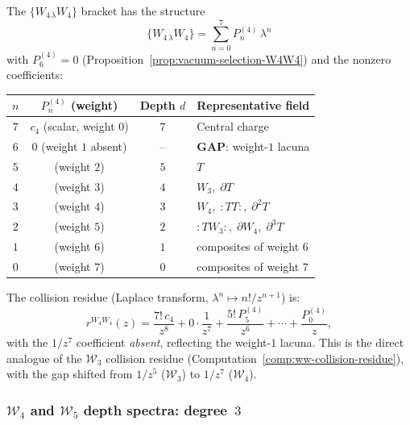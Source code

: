 \begin{computation}
\label{comp:w4w4-collision-residue}
%
The $\{W_{4\,\lambda} W_4\}$ bracket has the structure
\begin{equation}
\label{eq:w4w4-lambda-bracket}
\{W_{4\,\lambda} W_4\}
= \sum_{n=0}^{7} P_n^{(4)}\,\lambda^n
\end{equation}
with $P_6^{(4)} = 0$ (Proposition~\ref{prop:vacuum-selection-W4W4})
and the nonzero coefficients:
\begin{center}
\small
\renewcommand{\arraystretch}{1.3}
\begin{tabular}{cccl}
\toprule
$n$ & $P_n^{(4)}$ (weight) & Depth $d$ & Representative field \\
\midrule
$7$ & $c_4$ (scalar, weight $0$) & $7$
 & Central charge \\
$6$ & $0$ (weight $1$ absent) & --
 & \textbf{GAP}: weight-$1$ lacuna \\
$5$ & (weight $2$) & $5$
 & $T$ \\
$4$ & (weight $3$) & $4$
 & $W_3,\; \partial T$ \\
$3$ & (weight $4$) & $3$
 & $W_4,\; {:}TT{:},\; \partial^2 T$ \\
$2$ & (weight $5$) & $2$
 & ${:}TW_3{:},\; \partial W_4,\; \partial^3 T$ \\
$1$ & (weight $6$) & $1$
 & composites of weight $6$ \\
$0$ & (weight $7$) & $0$
 & composites of weight $7$ \\
\bottomrule
\end{tabular}
\end{center}

The collision residue (Laplace transform,
$\lambda^n \mapsto n!/z^{n+1}$) is:
\begin{equation}
\label{eq:w4w4-collision-residue}
r^{W_4 W_4}(z)
= \frac{7!\, c_4}{z^8}
+ 0 \cdot \frac{1}{z^7}
+ \frac{5!\, P_5^{(4)}}{z^6}
+ \cdots
+ \frac{P_0^{(4)}}{z},
\end{equation}
with the $1/z^7$ coefficient \emph{absent}, reflecting
the weight-$1$ lacuna. This is the direct analogue of
the $\mathcal{W}_3$ collision residue
(Computation~\ref{comp:ww-collision-residue}), with
the gap shifted from $1/z^5$ \textup{(}$\mathcal{W}_3$\textup{)}
to $1/z^7$ \textup{(}$\mathcal{W}_4$\textup{)}.
\end{computation}

\subsubsection{$\mathcal{W}_4$ and $\mathcal{W}_5$
depth spectra: degree~$3$}
\label{subsubsec:w4-w5-depth-degree-3}

